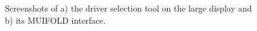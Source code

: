 \begin{figure}
\centering
    \hfill
    \hfill
    \hfill
  \caption{Screenshots of a) the driver selection tool on the large display and b) its MUIFOLD interface.}
  \label{fig:key_driver_tool}
\end{figure}